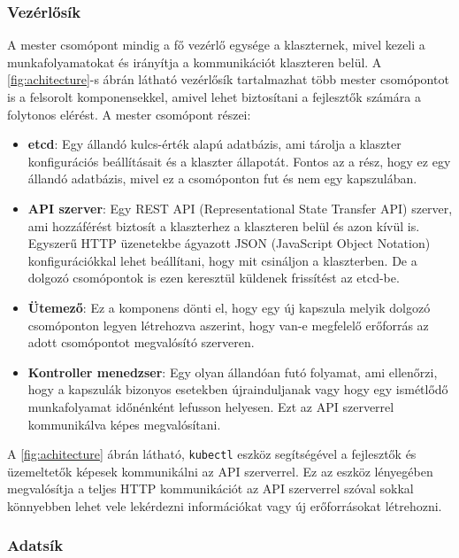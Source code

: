 \subsubsection{Vezérlősík}

A mester csomópont mindig a fő vezérlő egysége a klaszternek, mivel kezeli a 
munkafolyamatokat és irányítja a kommunikációt klaszteren belül. A 
\ref{fig:achitecture}-s ábrán látható vezérlősík tartalmazhat több mester csomópontot is 
a felsorolt komponensekkel, amivel lehet biztosítani a fejlesztők számára a folytonos 
elérést. A mester csomópont részei: 

\begin{itemize}
	\item \textbf{etcd}: Egy állandó kulcs-érték alapú adatbázis, ami tárolja 
	a klaszter konfigurációs beállításait és a klaszter állapotát. Fontos az a rész, 
	hogy ez egy állandó adatbázis, mivel ez a csomóponton fut és nem egy 
	kapszulában.   
	\item \textbf{API szerver}: Egy REST API (Representational State Transfer API) 
	szerver, ami hozzáférést biztosít a klaszterhez a klaszteren belül és azon kívül is. 
	Egyszerű HTTP üzenetekbe ágyazott JSON (JavaScript Object Notation) konfigurációkkal
	lehet beállítani, hogy mit csináljon a klaszterben. De a dolgozó csomópontok is ezen 
	keresztül küldenek frissítést az etcd-be. 
	\item \textbf{Ütemező}: Ez a komponens dönti el, hogy egy új kapszula melyik
	dolgozó csomóponton legyen létrehozva aszerint, hogy van-e megfelelő erőforrás
	az adott csomópontot megvalósító szerveren.
	\item \textbf{Kontroller menedzser}: Egy olyan állandóan futó folyamat, ami ellenőrzi,
	hogy a kapszulák bizonyos esetekben újrainduljanak vagy hogy egy ismétlődő 
	munkafolyamat időnénként lefusson helyesen. Ezt az API szerverrel kommunikálva
	képes megvalósítani. 
\end{itemize}

A \ref{fig:achitecture} ábrán látható, \texttt{kubectl} eszköz segítségével a fejlesztők 
és üzemeltetők képesek kommunikálni az API szerverrel. Ez az eszköz lényegében
megvalósítja a teljes HTTP kommunikációt az API szerverrel szóval sokkal könnyebben 
lehet vele lekérdezni információkat vagy új erőforrásokat létrehozni. 

\subsubsection{Adatsík}

